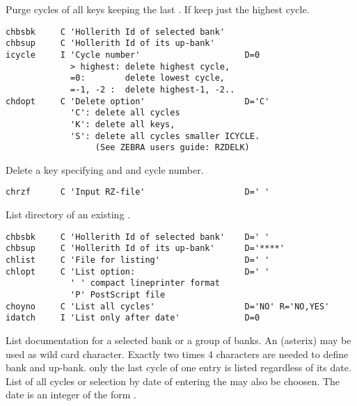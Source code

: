 Purge cycles of all keys keeping the last .
If  keep just the highest cycle.
 
 
\begin{verbatim}
chbsbk     C 'Hollerith Id of selected bank'
chbsup     C 'Hollerith Id of its up-bank'
icycle     I 'Cycle number'                     D=0
             > highest: delete highest cycle,
             =0:        delete lowest cycle,
             =-1, -2 :  delete highest-1, -2..
chdopt     C 'Delete option'                    D='C'
             'C': delete all cycles
             'K': delete all keys,
             'S': delete all cycles smaller ICYCLE.
                  (See ZEBRA users guide: RZDELK)
\end{verbatim}
 
Delete a key specifying  and  and cycle number.
 
 
\begin{verbatim}
chrzf      C 'Input RZ-file'                    D=' '
\end{verbatim}
 
List directory of an existing \RZfile.
 
\newpage

 
\begin{verbatim}
chbsbk     C 'Hollerith Id of selected bank'    D=' '
chbsup     C 'Hollerith Id of its up-bank'      D='****'
chlist     C 'File for listing'                 D=' '
chlopt     C 'List option:                      D=' '
             ' ' compact lineprinter format
             'P' PostScript file
choyno     C 'List all cycles'                  D='NO' R='NO,YES'
idatch     I 'List only after date'             D=0
\end{verbatim}
 
List documentation for a selected bank or a group of banks.
An  (asterix) may be used as wild card character.
Exactly two times 4 characters are needed to define bank and up-bank.
only the last cycle of one entry is listed regardless of its date.
List of all cycles or selection by date of entering the \RZfile{} may
also be choosen. The date is an integer of the form .
 
 
